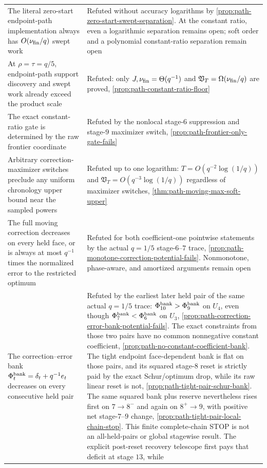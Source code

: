 \begin{center}
\begin{tabularx}{\textwidth}{@{}X p{}@{}}
The literal zero-start endpoint-path implementation always has
$O(\nu_{\rm fin}/q)$ swept work & Refuted without accuracy logarithms by
\cref{prop:path-zero-start-swept-separation}.  At the constant ratio, even a
logarithmic separation remains open; soft order and a polynomial
constant-ratio separation remain open \\
At $\rho=\tau=q/5$, endpoint-path support discovery and swept work already
exceed the product scale & Refuted: only
$J,\nu_{\rm fin}=\Theta(q^{-1})$ and
$\mathfrak V_T=\Omega(\nu_{\rm fin}/q)$ are proved,
\cref{prop:path-constant-ratio-floor} \\
The exact constant-ratio gate is determined by the raw frontier coordinate &
Refuted by the nonlocal stage-$6$ suppression and stage-$9$ maximizer switch,
\cref{prop:path-frontier-only-gate-fails} \\
Arbitrary correction-maximizer switches preclude any uniform chronology
upper bound near the sampled powers & Refuted up to one logarithm:
$T=O(q^{-2}\log(1/q))$ and
$\mathfrak V_T=O(q^{-3}\log(1/q))$ regardless of maximizer switches,
\cref{thm:path-moving-max-soft-upper} \\
The full moving correction decreases on every held face, or is always at most
$q^{-1}$ times the normalized error to the restricted optimum & Refuted for
both coefficient-one pointwise statements by the actual $q=1/5$
stage-$6$--$7$ trace,
\cref{prop:path-monotone-correction-potential-fails}.  Nonmonotone,
phase-aware, and amortized arguments remain open \\
The correction--error bank
$\Phi_t^{\rm bank}=\delta_t+q^{-1}e_t$ decreases on every consecutive held
pair & Refuted by the earliest later held pair of the same actual $q=1/5$
trace: $\Phi_{10}^{\rm bank}>\Phi_9^{\rm bank}$ on $U_4$, even though
$\Phi_7^{\rm bank}<\Phi_6^{\rm bank}$ on $U_3$,
\cref{prop:path-correction-error-bank-potential-fails}.  The exact constraints
from those two pairs have no common nonnegative constant coefficient,
\cref{prop:path-no-constant-coefficient-bank}.  The tight endpoint
face-dependent bank is flat on those pairs, and its squared stage-$8$ reset is
strictly paid by the exact Schur/optimum drop, while its raw linear reset is
not, \cref{prop:path-tight-pair-schur-bank}.  The same squared bank plus
reserve nevertheless rises first on $7\to8^-$ and again on $8^+\to9$, with
positive net stage-$7$--$9$ change,
\cref{prop:path-tight-pair-local-chain-stop}.  This finite complete-chain
STOP is not an all-held-pairs or global stagewise result.  The explicit
post-reset recovery telescope first pays that deficit at stage $13$, while

\end{tabularx}
\end{center}
